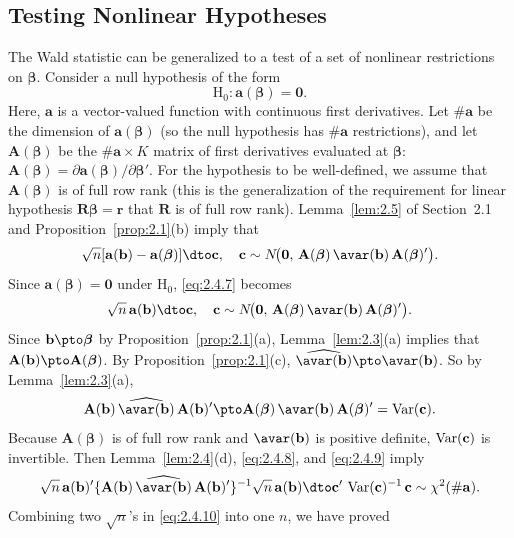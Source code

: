 \subsection*{Testing Nonlinear Hypotheses}

The Wald statistic can be generalized to a test of a set of nonlinear restrictions on
$\bm{\beta}$.  Consider a null hypothesis of the form
\[
  \mathrm{H}_0\colon \mathbf{a}(\bm{\beta}) = \mathbf{0}.
\]
Here, $\mathbf{a}$ is a vector-valued function with continuous first derivatives.
Let $\#\mathbf{a}$ be the dimension of $\mathbf{a}(\bm{\beta})$ (so the null
hypothesis has $\#\mathbf{a}$ restrictions), and let $\mathbf{A}(\bm{\beta})$ be the
$\#\mathbf{a} \times K$ matrix of first derivatives evaluated at $\bm{\beta}$:
$\mathbf{A}(\bm{\beta}) = \partial \mathbf{a}(\bm{\beta})/\partial \bm{\beta}'$.
For the hypothesis to be well-defined, we assume that $\mathbf{A}(\bm{\beta})$ is
of full row rank (this is the generalization of the requirement for linear hypothesis
$\mathbf{R}\bm{\beta} = \mathbf{r}$ that $\mathbf{R}$ is of full row rank).
Lemma~\ref{lem:2.5} of Section~2.1 and Proposition~\ref{prop:2.1}(b) imply that
\begin{equation}
  \sqrt{n}[\mathbf{a}(\mathbf{b}) - \mathbf{a}(\bm{\beta})]
  \dto \mathbf{c}, \quad
  \mathbf{c} \sim N\!\big(\mathbf{0},\,
  \mathbf{A}(\bm{\beta})\,\avar(\mathbf{b})\,\mathbf{A}(\bm{\beta})'\big).
  \label{eq:2.4.7}
\end{equation}
Since $\mathbf{a}(\bm{\beta}) = \mathbf{0}$ under $\mathrm{H}_0$,
\eqref{eq:2.4.7} becomes
\begin{equation}
  \sqrt{n}\,\mathbf{a}(\mathbf{b}) \dto \mathbf{c}, \quad
  \mathbf{c} \sim N\!\big(\mathbf{0},\,
  \mathbf{A}(\bm{\beta})\,\avar(\mathbf{b})\,\mathbf{A}(\bm{\beta})'\big).
  \label{eq:2.4.8}
\end{equation}
Since $\mathbf{b} \pto \bm{\beta}$ by Proposition~\ref{prop:2.1}(a),
Lemma~\ref{lem:2.3}(a) implies that
$\mathbf{A}(\mathbf{b}) \pto \mathbf{A}(\bm{\beta})$.  By
Proposition~\ref{prop:2.1}(c),
$\widehat{\avar(\mathbf{b})} \pto \avar(\mathbf{b})$.  So by
Lemma~\ref{lem:2.3}(a),
\begin{equation}
  \mathbf{A}(\mathbf{b})\,\widehat{\avar(\mathbf{b})}\,\mathbf{A}(\mathbf{b})'
  \pto \mathbf{A}(\bm{\beta})\,\avar(\mathbf{b})\,\mathbf{A}(\bm{\beta})'
  = \Var(\mathbf{c}).
  \label{eq:2.4.9}
\end{equation}
Because $\mathbf{A}(\bm{\beta})$ is of full row rank and $\avar(\mathbf{b})$ is
positive definite, $\operatorname{Var}(\mathbf{c})$ is invertible.  Then Lemma~\ref{lem:2.4}(d),
\eqref{eq:2.4.8}, and \eqref{eq:2.4.9} imply
\begin{equation}
  \sqrt{n}\,\mathbf{a}(\mathbf{b})'
  \{\mathbf{A}(\mathbf{b})\,\widehat{\avar(\mathbf{b})}\,
  \mathbf{A}(\mathbf{b})'\}^{-1}
  \sqrt{n}\,\mathbf{a}(\mathbf{b})
  \dto \mathbf{c}'\,\Var(\mathbf{c})^{-1}\,\mathbf{c}
  \sim \chi^2(\#\mathbf{a}).
  \label{eq:2.4.10}
\end{equation}
Combining two $\sqrt{n}$'s in \eqref{eq:2.4.10} into one $n$, we have proved

